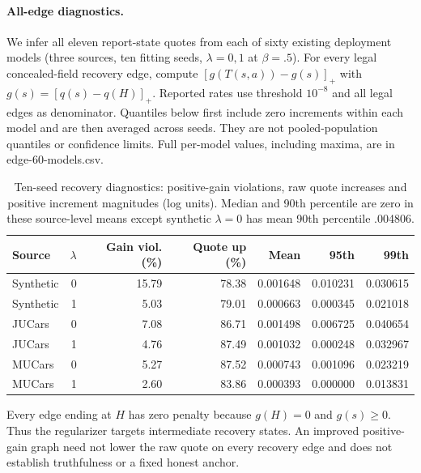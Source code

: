 \documentclass[11pt]{article}
\begin{document}
\paragraph{All-edge diagnostics.}
We infer all eleven report-state quotes from each of sixty existing deployment
models (three sources, ten fitting seeds, $\lambda=0,1$ at $\beta=.5$).
For every legal concealed-field recovery edge, compute
$[g(T(s,a))-g(s)]_+$ with $g(s)=[q(s)-q(H)]_+$.
Reported rates use threshold $10^{-8}$ and all legal edges as denominator.
Quantiles below first include zero increments within each model and are then
averaged across seeds. They are not pooled-population quantiles or confidence
limits. Full per-model values, including maxima, are in edge-60-models.csv.
\begin{table}[htbp]\centering\small
\caption{Ten-seed recovery diagnostics: positive-gain violations, raw quote increases and positive increment magnitudes (log units). Median and 90th percentile are zero in these source-level means except synthetic $\lambda=0$ has mean 90th percentile .004806.}
\begin{tabular}{lrrrrrr}\toprule
Source & $\lambda$ & Gain viol. (\%) & Quote up (\%) & Mean & 95th & 99th\\\midrule
Synthetic & 0 & 15.79 & 78.38 & 0.001648 & 0.010231 & 0.030615\\
Synthetic & 1 & 5.03 & 79.01 & 0.000663 & 0.000345 & 0.021018\\
JUCars & 0 & 7.08 & 86.71 & 0.001498 & 0.006725 & 0.040654\\
JUCars & 1 & 4.76 & 87.49 & 0.001032 & 0.000248 & 0.032967\\
MUCars & 0 & 5.27 & 87.52 & 0.000743 & 0.001096 & 0.023219\\
MUCars & 1 & 2.60 & 83.86 & 0.000393 & 0.000000 & 0.013831\\
\bottomrule\end{tabular}\end{table}
Every edge ending at $H$ has zero penalty because $g(H)=0$ and $g(s)\ge0$.
Thus the regularizer targets intermediate recovery states. An improved
positive-gain graph need not lower the raw quote on every recovery edge and
does not establish truthfulness or a fixed honest anchor.
\end{document}
